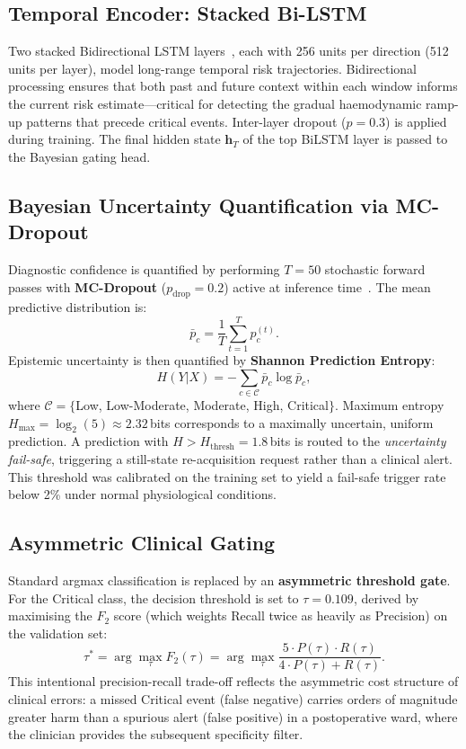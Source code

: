 \documentclass[conference]{IEEEtran}
\begin{document}
\subsection{Temporal Encoder: Stacked Bi-LSTM}
Two stacked Bidirectional LSTM layers~\cite{b5}, each with 256 units
per direction (512 units per layer), model long-range temporal risk
trajectories.  Bidirectional processing ensures that both past and
future context within each window informs the current risk
estimate---critical for detecting the gradual haemodynamic ramp-up
patterns that precede critical events.  Inter-layer dropout ($p=0.3$)
is applied during training.  The final hidden state $\mathbf{h}_T$ of
the top BiLSTM layer is passed to the Bayesian gating head.

\subsection{Bayesian Uncertainty Quantification via MC-Dropout}
Diagnostic confidence is quantified by performing $T=50$ stochastic
forward passes with \textbf{MC-Dropout} ($p_\mathrm{drop}=0.2$) active
at inference time~\cite{b3}.  The mean predictive distribution is:
\begin{equation}
  \bar{p}_c = \frac{1}{T}\sum_{t=1}^{T} p_c^{(t)}.
  \label{eq:mcd}
\end{equation}
Epistemic uncertainty is then quantified by \textbf{Shannon Prediction
Entropy}:
\begin{equation}
  H(Y|X) = -\sum_{c\in\mathcal{C}} \bar{p}_c \log \bar{p}_c,
  \label{eq:entropy}
\end{equation}
where $\mathcal{C} = \{$Low, Low-Moderate, Moderate, High,
Critical$\}$.  Maximum entropy $H_\mathrm{max} = \log_2(5) \approx
2.32$\,bits corresponds to a maximally uncertain, uniform prediction.
A prediction with $H > H_\mathrm{thresh} = 1.8$\,bits is routed to the
\textit{uncertainty fail-safe}, triggering a still-state
re-acquisition request rather than a clinical alert.  This threshold
was calibrated on the training set to yield a fail-safe trigger rate
below 2\% under normal physiological conditions.

\subsection{Asymmetric Clinical Gating}
Standard argmax classification is replaced by an \textbf{asymmetric
threshold gate}.  For the Critical class, the decision threshold is
set to $\tau = 0.109$, derived by maximising the $F_2$ score (which
weights Recall twice as heavily as Precision) on the validation set:
\begin{equation}
  \tau^* = \arg\max_\tau F_2(\tau)
    = \arg\max_\tau \frac{5 \cdot P(\tau) \cdot R(\tau)}
        {4 \cdot P(\tau) + R(\tau)}.
  \label{eq:f2}
\end{equation}
This intentional precision-recall trade-off reflects the asymmetric
cost structure of clinical errors: a missed Critical event (false
negative) carries orders of magnitude greater harm than a spurious
alert (false positive) in a postoperative ward, where the clinician
provides the subsequent specificity filter.
\end{document}
